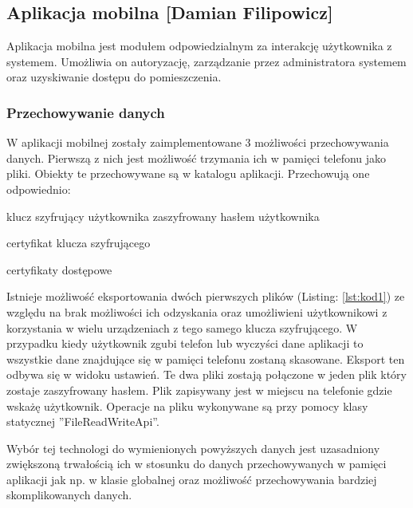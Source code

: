 \documentclass[twoside,10pt]{article}
\def\StudentB     {Damian Filipowicz}
\begin{document}
\subsection[Aplikacja mobilna]{Aplikacja mobilna [\StudentB]}
Aplikacja mobilna jest  modułem odpowiedzialnym za interakcję użytkownika z systemem. Umożliwia on autoryzację, zarządzanie przez administratora systemem oraz uzyskiwanie dostępu do pomieszczenia.
\subsubsection{Przechowywanie danych}
W aplikacji mobilnej zostały zaimplementowane 3 możliwości przechowywania danych. Pierwszą z nich jest możliwość trzymania ich w pamięci telefonu jako pliki. Obiekty te przechowywane są w katalogu aplikacji. Przechowują one odpowiednio:
\begin{itemize*}
\item klucz szyfrujący użytkownika zaszyfrowany hasłem użytkownika
\item certyfikat klucza szyfrującego 
\item certyfikaty dostępowe
\end{itemize*}

Istnieje możliwość eksportowania dwóch pierwszych plików (Listing: \ref{lst:kod1}) ze względu na brak możliwości ich odzyskania oraz umożliwieni użytkownikowi z korzystania w wielu urządzeniach z tego samego klucza szyfrującego. W przypadku kiedy użytkownik zgubi telefon lub  wyczyści dane aplikacji to wszystkie dane znajdujące się w pamięci telefonu zostaną skasowane. Eksport ten odbywa się w widoku ustawień. Te dwa pliki zostają połączone w jeden plik który zostaje zaszyfrowany hasłem. Plik zapisywany jest w miejscu na telefonie gdzie wskażę użytkownik.  Operacje na pliku wykonywane są przy pomocy klasy statycznej ''FileReadWriteApi''.

Wybór  tej technologi do wymienionych powyższych danych jest uzasadniony zwiększoną trwałością ich w stosunku do danych przechowywanych w pamięci aplikacji jak np.  w klasie globalnej oraz możliwość przechowywania bardziej skomplikowanych danych.
\end{document}
